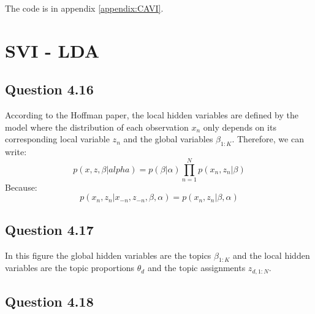 \documentclass{article}
\begin{document}
The code is in appendix \ref{appendix:CAVI}.

\section{SVI - LDA}

\subsection*{Question 4.16}

According to the Hoffman paper, the local hidden variables are defined by the model where the distribution of each observation $x_n$ only depends on its corresponding local variable $z_n$ and the global variables $\beta_{1:K}$.
Therefore, we can write:
\begin{equation}
    p(x, z, \beta | alpha) = p(\beta | \alpha) \prod_{n=1}^{N}p(x_n, z_n | \beta)
\end{equation}
Because:
\begin{equation}
    p(x_n, z_n | x_{-n}, z_{-n}, \beta, \alpha) = p(x_n, z_n | \beta, \alpha)
\end{equation}

\subsection*{Question 4.17}

In this figure the global hidden variables are the topics $\beta_{1:K}$ and the local hidden variables are the topic proportions $\theta_d$ and the topic assignments $z_{d,1:N}$.

\subsection*{Question 4.18}
\end{document}
